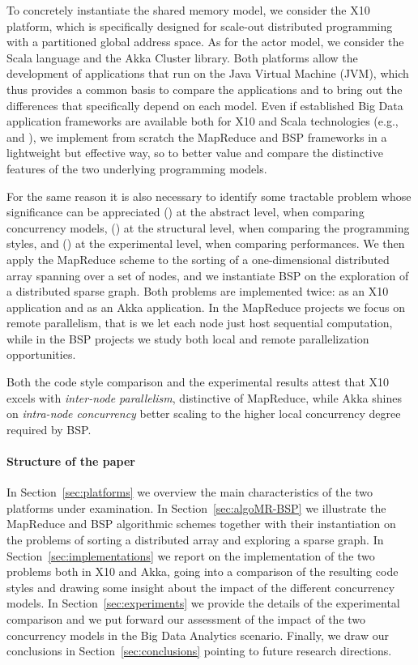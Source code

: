 \documentclass[a4paper]{article}
\numberwithin{equation}{section}
\begin{document}
To concretely instantiate the shared memory model, we consider the X10
platform, which is specifically designed for scale-out distributed
programming with a partitioned global address space.
As for the actor model, we consider the Scala language and the Akka
Cluster library. Both platforms allow the development of applications
that run on the Java Virtual Machine (JVM), which thus provides a 
common basis to compare the applications and to bring out
the differences that specifically depend on each model. 
Even if established Big Data application frameworks are available both
for X10 and Scala technologies (e.g., \cite{M3R-X10} and
\cite{Zaharia:2010:SCC:1863103.1863113}),  
we implement from scratch the MapReduce and BSP frameworks in a
lightweight but effective way, so to better value and compare the
distinctive features of the two underlying programming models. 

For the same reason it is also necessary to identify some tractable
problem whose significance can be appreciated 
() at the abstract level, when comparing concurrency models,
() at the structural level, when comparing the programming styles,
and () at the experimental level, when comparing performances. We
then apply the MapReduce scheme to the sorting of a one-dimensional
distributed array spanning over a set of nodes, and we instantiate BSP
on the exploration of a distributed sparse graph. Both problems are
implemented twice: as an X10 application and as an Akka application.
In the MapReduce projects we focus on remote parallelism, that is we
let each node just host sequential computation, while in the BSP
projects we study both local and remote parallelization
opportunities. 

Both the code style comparison and the experimental results
attest that X10 excels with \emph{inter-node parallelism}, distinctive
of MapReduce, while Akka shines on \emph{intra-node concurrency}
better scaling to the higher local concurrency degree required by BSP.


\paragraph{Structure of the paper}
In Section~\ref{sec:platforms} we overview the main characteristics
of the two platforms under examination. 
In Section~\ref{sec:algoMR-BSP} we illustrate the MapReduce and BSP
algorithmic schemes together with their instantiation on the problems
of sorting a distributed array and exploring a sparse graph. 
In Section~\ref{sec:implementations} we report on the implementation
of the two problems both in X10 and Akka, going into a comparison of
the resulting code styles and drawing some insight about the impact of
the different concurrency models. In Section~\ref{sec:experiments} we
provide the details of the experimental comparison and we put forward
our assessment of the impact of the two concurrency models in the Big
Data Analytics scenario. Finally, we draw our conclusions in
Section~\ref{sec:conclusions} pointing to future research directions.
\end{document}
